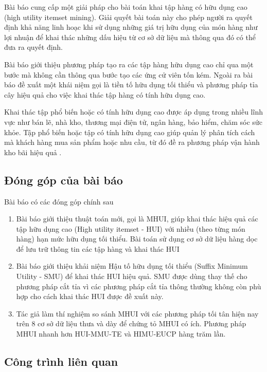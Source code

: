 Bài báo cung cấp một giải pháp cho bài toán khai tập hàng có hữu dụng cao (high utility itemset mining). Giải quyết bài toán này cho phép người ra quyết định khả năng linh hoạc khi sử dụng những giá trị hữu dụng của món hàng như lợi nhuận để khai thác những dấu hiệu từ cơ sở dữ liệu mà thông qua đó có thể đưa ra quyết định.  

Bài báo giới thiệu phương pháp tạo ra các tập hàng hữu dụng cao chỉ qua một bước mà không cần thông qua bước tạo các ứng cử viên tốn kém. Ngoài ra bài báo đề xuất một khái niệm gọi là tiền tố hữu dụng tối thiểu và phương pháp tỉa cây hiệu quả cho việc khai thác tập hàng có tính hữu dụng cao. 

Khai thác tập phổ biến hoặc có tính hữu dụng cao được áp dụng trong nhiều lĩnh vực như bán lẽ, nhà kho, thương mại điện tử, ngân hàng, bảo hiểm, chăm sóc sức khỏe. Tập phổ biến hoặc tập có tính hữu dụng cao giúp quản lý phân tích cách mà khách hàng mua sản phẩm hoặc nhu cầu, từ đó đề ra phương pháp vận hành kho bãi hiệu quả \cite{chen2005aggregation, chen2005association}.

\subsection{Đóng góp của bài báo}

Bài báo có các đóng góp chính sau

\begin{enumerate}
  \item Bài báo giới thiệu thuật toán mới, gọi là MHUI, giúp khai thác hiệu quả các tập hữu dụng cao (High utility itemset - HUI) với nhiều (theo từng món hàng) hạn mức hữu dụng tối thiểu. Bài toán sử dụng cơ sở dữ liệu hàng dọc để lưu trữ thông tin các tập hàng và khai thác HUI
  \item Bài báo giới thiệu khải niệm Hậu tố hữu dụng tối thiểu (Suffix Minimum Utility - SMU) để khai thác HUI hiệu quả. SMU được dùng thay thế cho phương pháp cắt tỉa vì các phương pháp cắt tỉa thông thường không còn phù hợp cho cách khai thác HUI được đề xuất này.
  \item Tác giả làm thí nghiệm so sánh MHUI với các phương pháp tối tân hiện nay trên 8 cơ sở dữ liệu thưa và dày để chứng tỏ MHUI có ích. Phương pháp MHUI nhanh hơn HUI-MMU-TE \cite{lin2016efficient} và HIMU-EUCP \cite{gan2016more} hàng trăm lần.  
\end{enumerate}

\subsection{Công trình liên quan}

